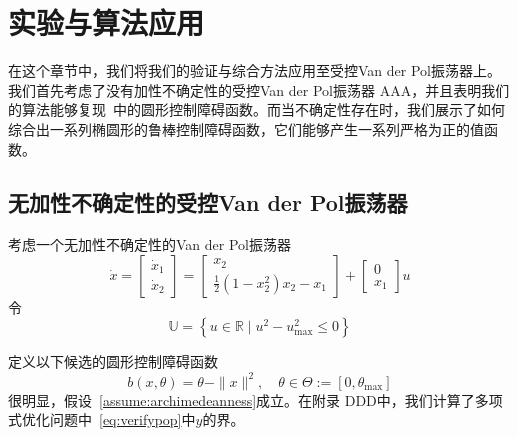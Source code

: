 
\chapter{实验与算法应用}

在这个章节中，我们将我们的验证与综合方法应用至受控Van der Pol振荡器上。我们首先考虑了没有加性不确定性的受控Van der Pol振荡器{\color{red} AAA}，并且表明我们的算法能够复现~\cite{clark22arxiv-cbf}中的圆形控制障碍函数。而当不确定性存在时，我们展示了如何综合出一系列椭圆形的鲁棒控制障碍函数，它们能够产生一系列严格为正的值函数。

\section{无加性不确定性的受控Van der Pol振荡器}
\label{sec:cleanvanderpol}

考虑一个无加性不确定性的Van der Pol振荡器~\cite{clark22arxiv-cbf}
\begin{equation}\label{eq:cleanvdpodynamics}
    \dot{x} = \left[ \begin{array}{c}
        \dot{x}_1 \\ \dot{x}_2
    \end{array} \right] 
    = \left[ \begin{array}{c}
        x_2 \\
        \frac{1}{2}(1 - x_2^2) x_2 - x_1
    \end{array} \right]
    + \left[ \begin{array}{c}
        0 \\ x_1
    \end{array} \right] u
\end{equation}
令
\begin{equation}\label{eq:cleanvdpou}
    \mathbb{U} = \left\{ u \in \mathbb{R} \mid u^2 - u_{\max}^2 \le 0 \right\}
\end{equation}

定义以下候选的圆形控制障碍函数
\begin{equation}
    \label{eq:cleanvdpocbf}
    b(x, \theta) = \theta - \parallel x \parallel^2, \quad \theta \in \Theta := [0, \theta_{\max}]
\end{equation}
很明显，假设~\ref{assume:archimedeanness}成立。在附录{\color{red} DDD}中，我们计算了多项式优化问题中~\eqref{eq:verifypop}中$y$的界。

